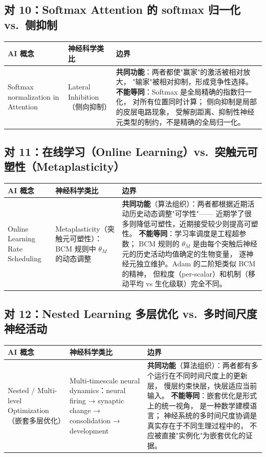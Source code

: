 \subsection*{对 10：Softmax Attention 的 softmax 归一化 vs.\ 侧抑制}

\begin{tabular}{p{4cm} p{3.5cm} p{6cm}}
\toprule
\textbf{AI 概念} & \textbf{神经科学类比} & \textbf{边界} \\
\midrule
Softmax normalization in Attention
& Lateral Inhibition（侧向抑制）
& \textbf{共同功能}：两者都使"赢家"的激活被相对放大，  
  "输家"被相对抑制，形成竞争性选择。
  \textbf{不能等同}：Softmax 是全局精确的指数归一化，
  对所有位置同时计算；
  侧向抑制是局部的皮层电路现象，
  受解剖距离、抑制性神经元类型的制约，不是精确的全局归一化。 \\
\bottomrule
\end{tabular}

\subsection*{对 11：在线学习（Online Learning）vs.\ 突触元可塑性（Metaplasticity）}

\begin{tabular}{p{4cm} p{3.5cm} p{6cm}}
\toprule
\textbf{AI 概念} & \textbf{神经科学类比} & \textbf{边界} \\
\midrule
Online Learning Rate Scheduling
& Metaplasticity（突触元可塑性）：BCM 规则中 $\theta_M$ 的动态调整
& \textbf{共同功能}（算法组织）：两者都根据近期活动历史动态调整"可学性"——
  近期学了很多则降低可塑性，近期接受较少则提高可塑性。
  \textbf{不能等同}：学习率调度是工程超参数；
  BCM 规则的 $\theta_M$ 是由每个突触后神经元的历史活动均值确定的生物变量，
  逐神经元独立维护。Adam 的二阶矩类似 BCM 的精神，
  但粒度（per-scalar）和机制（移动平均 vs 生化级联）完全不同。 \\
\bottomrule
\end{tabular}

\subsection*{对 12：Nested Learning 多层优化 vs.\ 多时间尺度神经活动}

\begin{tabular}{p{4cm} p{3.5cm} p{6cm}}
\toprule
\textbf{AI 概念} & \textbf{神经科学类比} & \textbf{边界} \\
\midrule
Nested / Multi-level Optimization（嵌套多层优化）
& Multi-timescale neural dynamics：neural firing → synaptic change → consolidation → development
& \textbf{共同功能}（算法组织）：两者都有多个运行在不同时间尺度上的更新层，
  慢层约束快层，快层适应当前输入。
  \textbf{不能等同}：嵌套优化是形式上的统一视角，
  是一种数学建模语言；
  神经系统的多时间尺度协调是真实存在于不同生理过程中的，
  不应被直接"实例化"为嵌套优化的证据。 \\
\bottomrule
\end{tabular}

